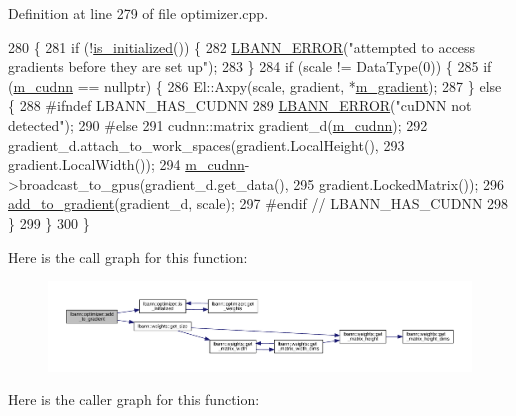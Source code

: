 Definition at line 279 of file optimizer.\+cpp.


\begin{DoxyCode}
280                                                 \{
281   \textcolor{keywordflow}{if} (!\hyperlink{classlbann_1_1optimizer_abccf0babf69e3d7c6e9a7fd0731c79b7}{is\_initialized}()) \{
282     \hyperlink{base_8hpp_a80b1d707117e968a6951b7222e4b2b87}{LBANN\_ERROR}(\textcolor{stringliteral}{"attempted to access gradients before they are set up"});
283   \}
284   \textcolor{keywordflow}{if} (scale != DataType(0)) \{
285     \textcolor{keywordflow}{if} (\hyperlink{classlbann_1_1optimizer_a2f24dbeaca18b06f4aa7d179bbf96680}{m\_cudnn} == \textcolor{keyword}{nullptr}) \{
286       El::Axpy(scale, gradient, *\hyperlink{classlbann_1_1optimizer_a3df20cb0ae2b60430ad4fd235d66c12e}{m\_gradient});
287     \} \textcolor{keywordflow}{else} \{
288 \textcolor{preprocessor}{      #ifndef LBANN\_HAS\_CUDNN}
289       \hyperlink{base_8hpp_a80b1d707117e968a6951b7222e4b2b87}{LBANN\_ERROR}(\textcolor{stringliteral}{"cuDNN not detected"});
290 \textcolor{preprocessor}{      #else}
291       cudnn::matrix gradient\_d(\hyperlink{classlbann_1_1optimizer_a2f24dbeaca18b06f4aa7d179bbf96680}{m\_cudnn});
292       gradient\_d.attach\_to\_work\_spaces(gradient.LocalHeight(),
293                                        gradient.LocalWidth());
294       \hyperlink{classlbann_1_1optimizer_a2f24dbeaca18b06f4aa7d179bbf96680}{m\_cudnn}->broadcast\_to\_gpus(gradient\_d.get\_data(),
295                                  gradient.LockedMatrix());
296       \hyperlink{classlbann_1_1optimizer_a435d31e3b7a0302e36439ee36f62dba8}{add\_to\_gradient}(gradient\_d, scale);
297 \textcolor{preprocessor}{      #endif // LBANN\_HAS\_CUDNN}
298     \}
299   \}
300 \}
\end{DoxyCode}
Here is the call graph for this function\+:\nopagebreak
\begin{figure}[H]
\begin{center}
\leavevmode
\includegraphics[width=350pt]{classlbann_1_1optimizer_a435d31e3b7a0302e36439ee36f62dba8_cgraph}
\end{center}
\end{figure}
Here is the caller graph for this function\+:\nopagebreak
